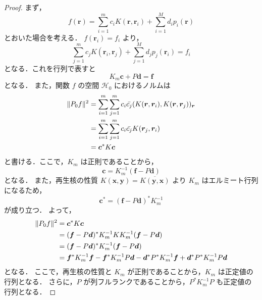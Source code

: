 \begin{proof}
    まず，
    \begin{equation}
        f(\bm{r}) = \sum_{i = 1}^{m} c_i K(\bm{r}, \bm{r}_i) + \sum_{i=1}^M d_i p_i(\bm{r})
    \end{equation}
    とおいた場合を考える．
    $f(\bm{r}_i) = f_i$ より，
    \begin{equation}
        \sum_{j = 1}^{m} c_j K(\bm{r}_i, \bm{r}_j) + \sum_{j=1}^M d_j p_j(\bm{r}_i) = f_i
    \end{equation}
    となる．これを行列で表すと
    \begin{equation}
        K_m \bm{c} + P \bm{d} = \bm{f}
    \end{equation}
    となる．
    また，関数 $f$ の空間 $\mathcal{H}_0$ におけるノルムは
    \begin{align}
        \|P_0 f\|^2 & =
        \sum_{i = 1}^{m} \sum_{j = 1}^{m} c_i \bar{c_j} (K(\bm{r}, \bm{r}_i), K(\bm{r}, \bm{r}_j))_{\bm{r}}
        \notag          \\ & =
        \sum_{i = 1}^{m} \sum_{j = 1}^{m} c_i \bar{c_j} K(\bm{r}_j, \bm{r}_i)
        \notag          \\ & =
        \bm{c}^* K \bm{c}
    \end{align}
    と書ける．ここで，$K_m$ は正則であることから，
    \begin{equation}
        \bm{c} = K_m^{-1} (\bm{f} - P \bm{d})
    \end{equation}
    となる．
    また，再生核の性質 $K(\bm{x}, \bm{y}) = \overline{K(\bm{y}, \bm{x})}$ より
    $K_m$ はエルミート行列になるため，
    \begin{equation}
        \bm{c}^* = (\bm{f} - P \bm{d})^* K_m^{-1}
    \end{equation}
    が成り立つ．
    よって，
    \begin{align}
        \|P_0 f\|^2 & =
        \bm{c}^* K \bm{c}
        \notag          \\ & =
        (\bm{f} - P \bm{d})^* K_m^{-1} K K_m^{-1} (\bm{f} - P \bm{d})
        \notag          \\ & =
        (\bm{f} - P \bm{d})^* K_m^{-1} (\bm{f} - P \bm{d})
        \notag          \\ & =
        \bm{f}^* K_m^{-1} \bm{f}- \bm{f}^* K_m^{-1} P \bm{d}
        - \bm{d}^* P^* K_m^{-1} \bm{f} + \bm{d}^* P^* K_m^{-1} P \bm{d}
    \end{align}
    となる．
    ここで，再生核の性質と $K_m$ が正則であることから，$K_m$ は正定値の行列となる．
    さらに，$P$ が列フルランクであることから，$P^* K_m^{-1} P$ も正定値の行列となる．

\end{proof}
